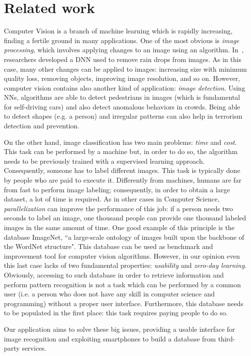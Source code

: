 \section{Related work}
\label{sec:related}

Computer Vision is a branch of machine learning which is rapidly increasing, 
finding a fertile ground in many applications. One of the most obvious is 
\textit{image processing}, which involves applying changes to an image using an 
algorithm. In~\cite{Rain}, researchers developed a DNN used to remove rain 
drops from images. As in this case, many other changes can be applied to 
images: increasing size with minimum quality loss, removing objects, improving 
image resolution, and so on. However, computer vision contains also another kind 
of application: \textit{image detection}. Using NNs, algorithms are able to 
detect pedestrians in images\cite{Pedestrian} (which is fundamental for 
self-driving cars) and also detect anomalous behaviors in crowds\cite{Crowd}. 
Being able to detect shapes (e.g. a person) and irregular patterns can also 
help in terrorism detection and prevention.

On the other hand, image classification has two main problems: \textit{time} 
and \textit{cost}. This task can be performed by a machine but, in order to do 
so, the algorithm needs to be previously trained with a supervised learning 
approach. Consequently, someone has to label different images. This task is 
typically done by people who are paid to execute it. Differently from machines, 
humans are far from fast to perform image labeling; consequently, in order to 
obtain a large dataset, a lot of time is required.
As in other cases in Computer Science, \textit{parallelization} can improve the 
performance of this job: if a person needs two seconds to label an image, one 
thousand people can provide one thousand labeled images in the same amount of 
time. One good example of this principle is the database 
ImageNet\cite{ImageNet2}, ``a large-scale ontology of images built upon the 
backbone of the WordNet structure"\cite{ImageNet1}. This database can be used 
as benchmark and improvement tool for computer vision algorithms.
However, in our opinion even this last case lacks of two fundamental 
properties: \textit{usability} and \textit{zero-day learning}. Obviously, 
accessing to such database in order to retrieve information and perform pattern 
recognition is not a task which can be performed by a common user (i.e. a 
person who does not have any skill in computer science and programming) without 
a proper user interface. Furthermore, this database needs to be populated in the 
first place: this task requires paying people to do so.

Our application aims to solve these big issues, providing a usable interface 
for image recognition and exploiting smartphones to build a database from 
third-party services.
